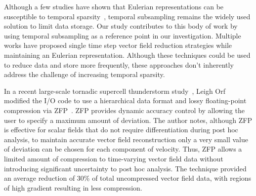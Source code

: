 Although a few studies have shown that Eulerian representations can be susceptible to temporal sparsity~\cite{costa2004lagrangian}\cite{Qin2014}\cite{agranovsky2014improved}\cite{sane2018revisiting}, temporal subsampling remains the widely used solution to limit data storage.
%
Our study contributes to this body of work by using temporal subsampling as a reference point in our investigation.
%
Multiple works have proposed single time step vector field reduction strategies while maintaining an Eulerian representation.
%
%
%
%
%
Although these techniques could be used to reduce data and store more frequently, these approaches don't inherently address the challenge of increasing temporal sparsity.
%

In a recent large-scale tornadic supercell thunderstorm study~\cite{atmos10100578}, Leigh Orf modified the I/O code to use a hierarchical data format and lossy floating-point compression via ZFP~\cite{lindstrom2006fast}.
%
ZFP provides dynamic accuracy control by allowing the user to specify a maximum amount of deviation.
%
The author notes, although ZFP is effective for scalar fields that do not require differentiation during post hoc analysis, to maintain accurate vector field reconstruction only a very small value of deviation can be chosen for each component of velocity.
%
Thus, ZFP allows a limited amount of compression to time-varying vector field data without introducing significant uncertainty to post hoc analysis. 
%
The technique provided an average reduction of 30\% of total uncompressed vector field data, with regions of high gradient resulting in less compression. 
%

%
%

